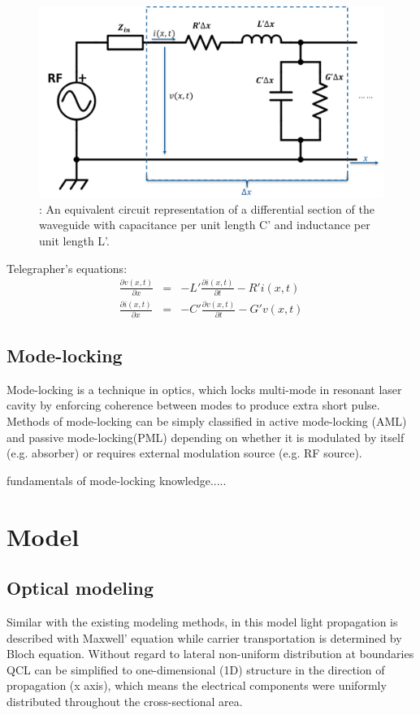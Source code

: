 \documentclass[11pt,final]{scrbook}
\begin{document}
\begin{figure}[htbp]
\begin{center}
\includegraphics[scale=0.4]{images/TLcircuit}
\caption{: An equivalent circuit representation of a differential section of the waveguide with capacitance per unit length C’ and inductance per unit length L’.}
\label{fig:TLcircuit}
\end{center}
\end{figure}
Telegrapher's equations:
\begin{eqnarray}
\frac { \partial v(x,t) }{ \partial x }  &=& -L'\frac { \partial i(x,t) }{ \partial t }-R'i(x,t) \label{eq:TLequation1}\\
\frac { \partial i(x,t) }{ \partial x }  &=& - C'\frac { \partial v(x,t) }{ \partial t }-G'v(x,t) \label{eq:TLequation2}
\end{eqnarray}

\section{Mode-locking}
Mode-locking is a technique in optics, which locks multi-mode in resonant laser cavity by enforcing coherence between modes to produce extra short pulse\cite{haus2000mode}. Methods of mode-locking can be simply classified in active mode-locking (AML) and passive mode-locking(PML) depending on whether it is modulated by itself (e.g. absorber) or requires external modulation source (e.g. RF source).

fundamentals of mode-locking knowledge.....
\chapter{Model}
\section{Optical modeling}
Similar with the existing modeling methods, in this model light propagation is described with Maxwell' equation while carrier transportation is determined by Bloch equation. Without regard to lateral non-uniform distribution at boundaries \cite{huang2014non, dhar2015nanoscopic} QCL can be simplified to one-dimensional (1D) structure in the direction of propagation (x axis), which means the electrical components were uniformly distributed throughout the cross-sectional area. 
\end{document}
